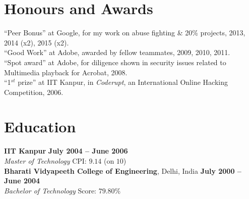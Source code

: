 \documentclass[margin,line]{resume}
\begin{document}
\begin{resume}
\section{Honours and Awards}
``Peer Bonus'' at Google, for my work on abuse fighting \& 20\% projects, 2013, 2014 (x2), 2015 (x2).\\
``Good Work'' at Adobe, awarded by fellow teammates, 2009, 2010, 2011.\\
``Spot award'' at Adobe, for diligence shown in security issues related to Multimedia playback for Acrobat, 2008.\\
``1$^{st}$ prize'' at IIT Kanpur, in \textit{Coderupt}, an International Online Hacking Competition, 2006.

\section{Education}

\textbf{IIT Kanpur} \hfill \textbf{July 2004 -- June 2006}\\
\textsl{Master of Technology} \hfill CPI: $9.14$ (on $10$)\\%
\textbf{Bharati Vidyapeeth College of Engineering}, Delhi, India \hfill \textbf{July 2000 -- June 2004}\\
\textsl{Bachelor of Technology} \hfill Score: $79.80$\%

\end{resume}
\end{document}
